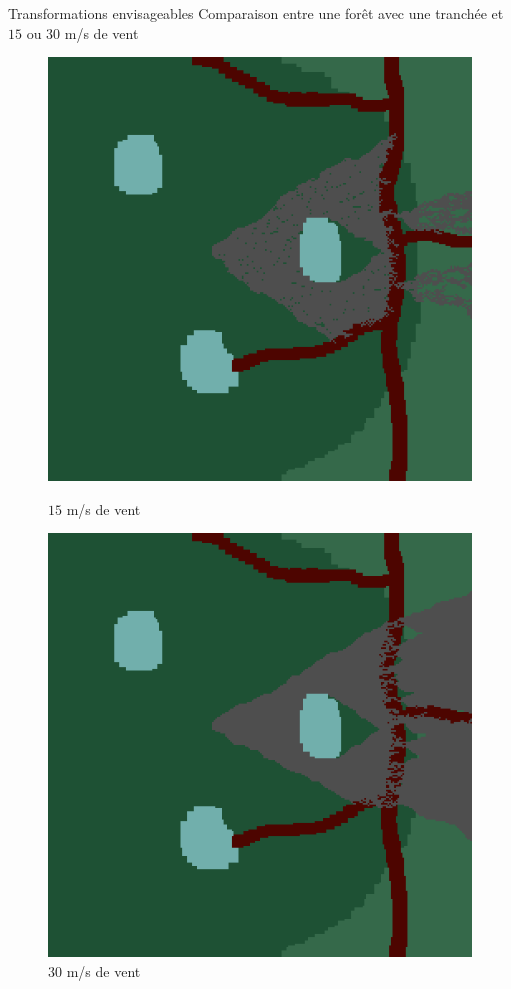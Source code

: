 \documentclass{beamer}
\begin{document}
\begin{frame}{Transformations envisageables \hyperlink{jump}{\beamerbutton{ }} \hypertarget{16}{\beamerbutton{ }}}
    Comparaison entre une forêt avec une tranchée et $15$ ou $30$ m/s de vent
    
    \begin{figure}[!htb]
        \begin{minipage}{0.48\textwidth}
          \centering
          \includegraphics[width=.8\linewidth]{pictures/trans/treach_15.png}
          \caption{$15$ m/s de vent}\label{Fig:Data1}
        \end{minipage}\hfill
        \begin{minipage}{0.48\textwidth}
          \centering
          \includegraphics[width=.8\linewidth]{pictures/trans/treach_30.png}
          \caption{$30$ m/s de vent}\label{Fig:Data2}
        \end{minipage}
     \end{figure}
\end{frame}
\end{document}
